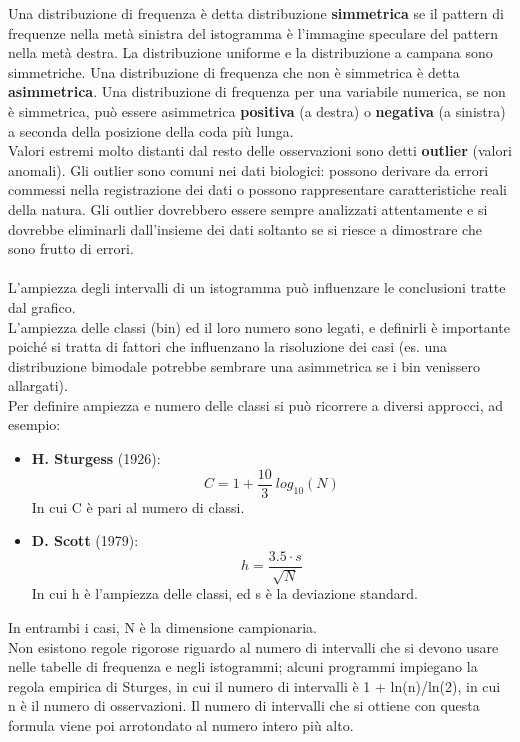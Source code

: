 \documentclass[10pt, draft]{book}
\begin{document}
Una distribuzione di frequenza è detta distribuzione \textbf{simmetrica} se il pattern di frequenze nella metà sinistra del istogramma è l'immagine speculare del pattern nella metà destra. La distribuzione uniforme e la distribuzione a campana sono simmetriche. Una distribuzione di frequenza che non è simmetrica è detta \textbf{asimmetrica}. Una distribuzione di frequenza per una variabile numerica, se non è simmetrica, può essere asimmetrica \textbf{positiva} (a destra) o \textbf{negativa} (a sinistra) a seconda della posizione della coda più lunga.
\\
Valori estremi molto distanti dal resto delle osservazioni sono detti \textbf{outlier} (valori anomali). Gli outlier sono comuni nei dati biologici: possono derivare da errori commessi nella registrazione dei dati o possono rappresentare caratteristiche reali della natura. Gli outlier dovrebbero essere sempre analizzati attentamente e si dovrebbe eliminarli dall'insieme dei dati soltanto se si riesce a dimostrare che sono frutto di errori.
\\
\\
L'ampiezza degli intervalli di un istogramma può influenzare le conclusioni tratte dal grafico.
\\
L’ampiezza delle classi (bin) ed il loro numero sono legati, e definirli è importante poiché si tratta di fattori che influenzano la risoluzione dei casi (es. una distribuzione bimodale potrebbe sembrare una asimmetrica se i bin venissero allargati).
\\
Per definire ampiezza e numero delle classi si può ricorrere a diversi approcci, ad esempio:
\begin{itemize}
    \item \textbf{H. Sturgess} (1926):
    \begin{equation}
        C = 1 + \frac{10}{3}\ log_{10}(N)
    \end{equation}
    In cui C è pari al numero di classi.
    \item \textbf{D. Scott} (1979):
    \begin{equation}
        h = \frac{3.5 \cdot s}{\sqrt{N}}
    \end{equation}
    In cui h è l'ampiezza delle classi, ed s è la deviazione standard.
\end{itemize}
In entrambi i casi, N è la dimensione campionaria.
\\
Non esistono regole rigorose riguardo al numero di intervalli che si devono usare nelle tabelle di frequenza e negli istogrammi; alcuni programmi impiegano la regola empirica di Sturges, in cui il numero di intervalli è 1 + ln(n)/ln(2), in cui n è il numero di osservazioni. Il numero di intervalli che si ottiene con questa formula viene poi arrotondato al numero intero più alto. 
\end{document}
